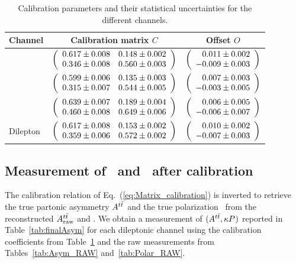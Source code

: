 \documentclass[aps,prd,twocolumn,showpacs,superscriptaddress,groupedaddress,floatfix]{revtex4}
\begin{document}
\begin{table}[!ht]\caption{Calibration parameters and their statistical uncertainties for the different channels.
}
\label{tab:calibSlope}
\begin{tabular}{lcc}
\hline
\hline
  Channel 		& Calibration matrix $C$ 	& Offset $O$ \\
  \hline
  \emu		 & $ {\left(\begin{array}{cc} {0.617  \pm 0.008   } & { 0.148  \pm 0.002  }\\ { 0.346  \pm 0.008  } &{0.560  \pm 0.003   } \end{array}\right)}  $  & $  {\left(\begin{array}{c} \phantom{-}0.011  \pm 0.002    \\ { -0.009  \pm 0.003  } \end{array}\right)} $  \\
 \hline
  \ee 		        & $ {\left(\begin{array}{cc} {0.599  \pm 0.006   } & { 0.135  \pm 0.003  }\\ { 0.315  \pm 0.007  } &{0.544  \pm 0.005   } \end{array}\right)}  $  & $  {\left(\begin{array}{c} \phantom{-}0.007  \pm 0.003    \\ { -0.003  \pm 0.005  } \end{array}\right)} $  \\
  \hline
  \mumu 	& $ {\left(\begin{array}{cc} {0.639  \pm 0.007   } & { 0.189  \pm 0.004  }\\ { 0.460  \pm 0.008  } &{0.649  \pm 0.006   } \end{array}\right)}  $  & $  {\left(\begin{array}{c} \phantom{-}0.006  \pm 0.005    \\ { -0.006  \pm 0.007  } \end{array}\right)} $  \\ 
\hline
  Dilepton 	 & $ {\left(\begin{array}{cc} {0.617  \pm 0.008   } & { 0.153  \pm 0.002  }\\ { 0.359  \pm 0.006  } &{0.572  \pm 0.002   } \end{array}\right)}  $  & $  {\left(\begin{array}{c} \phantom{-}0.010  \pm 0.002    \\ { -0.007  \pm 0.003  } \end{array}\right)} $  \\  
  \hline  \hline
\end{tabular}

\end{table}


\label{sec:ensemble_calib}











\subsection{Measurement of \Attfb\ and \Ptt\ after calibration}
\label{sec:att_measurement}

The calibration relation of Eq.~(\ref{eq:Matrix_calibration}) is inverted
to retrieve the true partonic asymmetry $A^{t\bar t}$ and the true polarization \Ptt\ from the reconstructed  $A^{t\bar t}_{\rm raw}$ and \Praw.
We obtain 
a measurement of $(A^{t\bar t},\kappa P^{}_{})$ reported in Table~\ref{tab:finalAsym}  for each dileptonic channel using the calibration coefficients from 
Table~\ref{tab:calibSlope} and the raw measurements from  Tables~\ref{tab:Asym_RAW} and~\ref{tab:Polar_RAW}.
\end{document}
